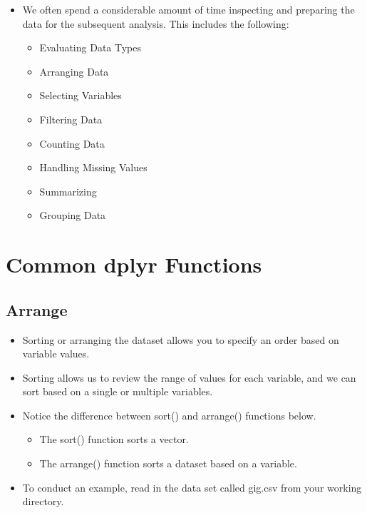 \documentclass[
  letterpaper,
  DIV=11,
  numbers=noendperiod]{scrreprt}
\providecommand{\tightlist}{%
  \setlength{\itemsep}{0pt}\setlength{\parskip}{0pt}}\usepackage{longtable,booktabs,array}
\begin{document}
\begin{itemize}
\tightlist
\item
  We often spend a considerable amount of time inspecting and preparing
  the data for the subsequent analysis. This includes the following:

  \begin{itemize}
  \tightlist
  \item
    Evaluating Data Types
  \item
    Arranging Data
  \item
    Selecting Variables
  \item
    Filtering Data
  \item
    Counting Data
  \item
    Handling Missing Values
  \item
    Summarizing
  \item
    Grouping Data
  \end{itemize}
\end{itemize}

\section{Common dplyr Functions}\label{common-dplyr-functions}

\subsection{Arrange}\label{arrange}

\begin{itemize}
\tightlist
\item
  Sorting or arranging the dataset allows you to specify an order based
  on variable values.
\item
  Sorting allows us to review the range of values for each variable, and
  we can sort based on a single or multiple variables.
\item
  Notice the difference between sort() and arrange() functions below.

  \begin{itemize}
  \tightlist
  \item
    The sort() function sorts a vector.
  \item
    The arrange() function sorts a dataset based on a variable.
  \end{itemize}
\item
  To conduct an example, read in the data set called gig.csv from your
  working directory.
\end{itemize}
\end{document}
